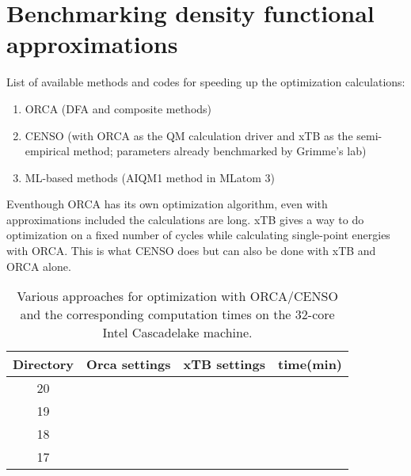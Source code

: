 \section{Benchmarking density functional approximations}
\label{sec:benchmarking_dfa}
List of available methods and codes for speeding up the optimization calculations:
\begin{enumerate}
    \item ORCA (DFA and composite methods)
    \item CENSO (with ORCA as the QM calculation driver and xTB as the semi-empirical method; parameters already benchmarked by Grimme's lab)
    \item ML-based methods (AIQM1 method in MLatom 3)
\end{enumerate}
Eventhough ORCA has its own optimization algorithm, even with approximations included the calculations are long.
xTB gives a way to do optimization on a fixed number of cycles while calculating single-point energies with ORCA. This is what CENSO does but can also be done with xTB and ORCA alone.
\begin{table}
\centering

\begin{tabular}{|c|c|c|c|} \hline
Directory & Orca settings & xTB settings & time(min) \\ \hline
20 &  &  & \\ \hline
19 &  &  & \\ \hline
18 &  &  & \\ \hline
17 &  &  & \\ \hline

\end{tabular}
\caption{Various approaches for optimization with ORCA/CENSO and the corresponding computation times on the 32-core Intel Cascadelake machine.}
\end{table}